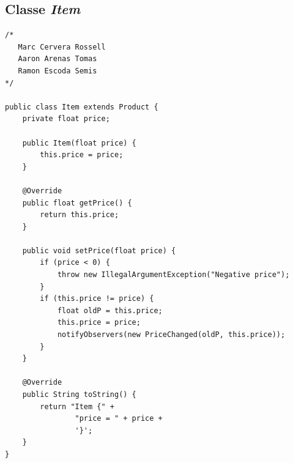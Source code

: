 \documentclass[a4paper,12pt]{article}
\begin{document}
\subsection{Classe \textit{Item}}
\begin{lstlisting} 
/* 
   Marc Cervera Rossell
   Aaron Arenas Tomas
   Ramon Escoda Semis
*/

public class Item extends Product {
    private float price;

    public Item(float price) {
        this.price = price;
    }

    @Override
    public float getPrice() {
        return this.price;
    }

    public void setPrice(float price) {
        if (price < 0) {
            throw new IllegalArgumentException("Negative price");
        }
        if (this.price != price) {
            float oldP = this.price;
            this.price = price;
            notifyObservers(new PriceChanged(oldP, this.price));
        }
    }

    @Override
    public String toString() {
        return "Item {" +
                "price = " + price +
                '}';
    }
}
\end{lstlisting}
\newpage
\end{document}
